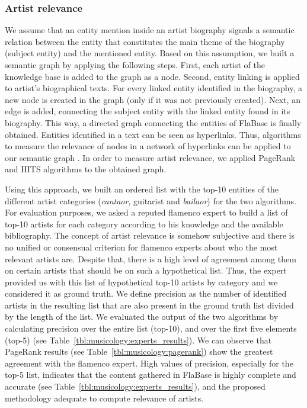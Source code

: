\subsubsection{Artist relevance}
\label{sec:musicology:relevance}

We assume that an entity mention inside an artist biography signals a semantic relation between the entity that constitutes the main theme of the biography (subject entity) and the mentioned entity. Based on this assumption, we built a semantic graph by applying the following steps. First, each artist of the knowledge base is added to the graph as a node. Second, entity linking is applied to artist's biographical texts. For every linked entity identified in the biography, a new node is created in the graph (only if it was not previously created). Next, an edge is added, connecting the subject entity with the linked entity found in its biography. This way, a directed graph connecting the entities of FlaBase is finally obtained. Entities identified in a text can be seen as hyperlinks. Thus, algorithms to measure the relevance of nodes in a network of hyperlinks can be applied to our semantic graph \citep{Bellomi2005}. In order to measure artist relevance, we applied PageRank \citep{Brin1998} and HITS \citep{Kleinberg1999} algorithms to the obtained graph. 

Using this approach, we built an ordered list with the top-10 entities of the different artist categories (\textit{cantaor}, guitarist and \textit{bailaor}) for the two algorithms. For evaluation purposes, we asked a reputed flamenco expert to build a list of top-10 artists for each category according to his knowledge and the available bibliography. The concept of artist relevance is somehow subjective and there is no unified or consensual criterion for flamenco experts about who the most relevant artists are. Despite that, there is a high level of agreement among them on certain artists that should be on such a hypothetical list. Thus, the expert provided us with this list of hypothetical top-10 artists by category and we considered it as ground truth. We define precision as the number of identified artists in the resulting list that are also present in the ground truth list divided by the length of the list. We evaluated the output of the two algorithms by calculating precision over the entire list (top-10), and over the first five elements (top-5) (see Table~\ref{tbl:musicology:experts_results}). We can observe that Page\-Rank results (see Table~\ref{tbl:musicology:pagerank}) show the greatest agreement with the flamenco expert. 
High values of precision, especially for the top-5 list, indicates that the content gathered in FlaBase is highly complete and accurate (see Table~\ref{tbl:musicology:experts_results}), and the proposed methodology adequate to compute relevance of artists. 

